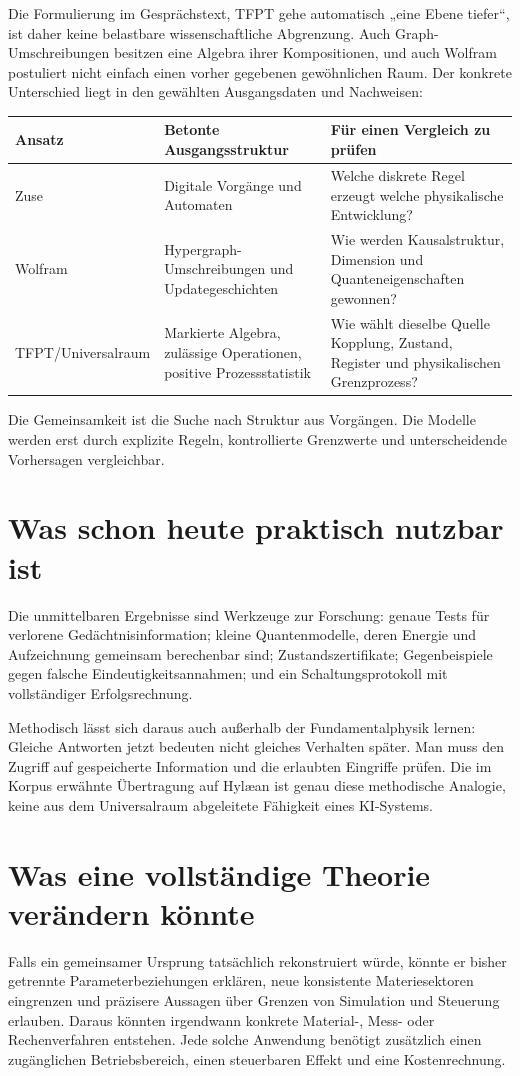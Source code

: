 Die Formulierung im Gesprächstext, TFPT gehe automatisch „eine Ebene tiefer“, ist daher keine belastbare wissenschaftliche Abgrenzung. Auch Graph-Umschreibungen besitzen eine Algebra ihrer Kompositionen, und auch Wolfram postuliert nicht einfach einen vorher gegebenen gewöhnlichen Raum. Der konkrete Unterschied liegt in den gewählten Ausgangsdaten und Nachweisen:
\par\noindent\begin{tabularx}{\linewidth}{L{26mm}Y Y}
\toprule \textbf{Ansatz}&\textbf{Betonte Ausgangsstruktur}&\textbf{Für einen Vergleich zu prüfen}\\\midrule
Zuse&Digitale Vorgänge und Automaten&Welche diskrete Regel erzeugt welche physikalische Entwicklung?\\
Wolfram&Hypergraph-Umschreibungen und Updategeschichten&Wie werden Kausalstruktur, Dimension und Quanteneigenschaften gewonnen?\\
TFPT/Universalraum&Markierte Algebra, zulässige Operationen, positive Prozessstatistik&Wie wählt dieselbe Quelle Kopplung, Zustand, Register und physikalischen Grenzprozess?\\\bottomrule
\end{tabularx}\par
Die Gemeinsamkeit ist die Suche nach Struktur aus Vorgängen. Die Modelle werden erst durch explizite Regeln, kontrollierte Grenzwerte und unterscheidende Vorhersagen vergleichbar.

\section{Was schon heute praktisch nutzbar ist}
Die unmittelbaren Ergebnisse sind Werkzeuge zur Forschung: genaue Tests für verlorene Gedächtnisinformation; kleine Quantenmodelle, deren Energie und Aufzeichnung gemeinsam berechenbar sind; Zustandszertifikate; Gegenbeispiele gegen falsche Eindeutigkeitsannahmen; und ein Schaltungsprotokoll mit vollständiger Erfolgsrechnung.

Methodisch lässt sich daraus auch außerhalb der Fundamentalphysik lernen: Gleiche Antworten jetzt bedeuten nicht gleiches Verhalten später. Man muss den Zugriff auf gespeicherte Information und die erlaubten Eingriffe prüfen. Die im Korpus erwähnte Übertragung auf Hylæan ist genau diese methodische Analogie, keine aus dem Universalraum abgeleitete Fähigkeit eines KI-Systems.

\section{Was eine vollständige Theorie verändern könnte}
Falls ein gemeinsamer Ursprung tatsächlich rekonstruiert würde, könnte er bisher getrennte Parameterbeziehungen erklären, neue konsistente Materiesektoren eingrenzen und präzisere Aussagen über Grenzen von Simulation und Steuerung erlauben. Daraus könnten irgendwann konkrete Material-, Mess- oder Rechenverfahren entstehen. Jede solche Anwendung benötigt zusätzlich einen zugänglichen Betriebsbereich, einen steuerbaren Effekt und eine Kostenrechnung.

